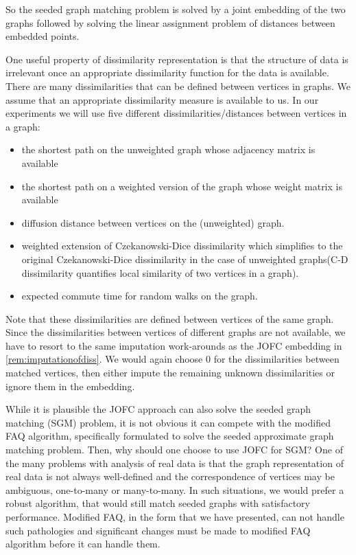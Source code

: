 \documentclass[12pt,oneside,final]{thesis}\usepackage[]{graphicx}\usepackage[]{color}
\begin{document}
So the seeded graph matching problem is solved by a joint embedding of the two graphs followed by solving the linear assignment problem of distances between embedded points.
 
One useful property of dissimilarity representation is that the structure of data is irrelevant once an appropriate dissimilarity function  for the data is available. 
There are many dissimilarities that can be defined between vertices in graphs. We assume that an appropriate dissimilarity measure is available to us.
In our experiments we will use five different dissimilarities/distances between vertices in a graph:
\begin{itemize}
 \item the shortest path on the  unweighted graph whose adjacency matrix is available
 \item the shortest path on a weighted version of the graph whose weight matrix is available
 \item diffusion distance between vertices on the (unweighted) graph.
 \item weighted extension of Czekanowski-Dice dissimilarity\cite{DICE,weightedDICE} which simplifies to the original Czekanowski-Dice dissimilarity in the case of unweighted graphs(C-D dissimilarity  quantifies local similarity of two vertices in a graph).
 \item expected commute time for random walks on the graph.
 \end{itemize}
 \begin{remark}
 Note that these dissimilarities are defined between vertices of the same graph. Since the dissimilarities between vertices of different graphs are not available, we have to resort to the same imputation work-arounds  as the JOFC embedding in  \ref{rem:imputationofdiss}.
 We would again choose 0 for the dissimilarities between matched vertices, then either impute the remaining unknown dissimilarities or ignore them in the embedding.
 \end{remark}
 
 While it is plausible the JOFC approach can also solve the seeded graph matching (SGM) problem, it is not obvious it can compete with the modified FAQ algorithm, specifically formulated to solve the  seeded approximate graph matching problem. Then, why should one choose to use JOFC for SGM?
One of the many problems with analysis of real data is that the graph representation of real data is 
 not always well-defined and the correspondence of vertices may be  ambiguous, one-to-many or many-to-many. 
In such situations, we would prefer a robust algorithm, that would still match seeded graphs with satisfactory performance. 
Modified FAQ, in the form that we have presented, can not handle such pathologies and significant changes must be made to modified FAQ algorithm before it can handle them. 
\end{document}
